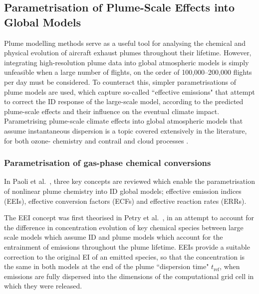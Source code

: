 \subsection{Parametrisation of Plume-Scale Effects into Global Models}
Plume modelling methods serve as a useful tool for analysing the chemical and physical evolution of aircraft exhaust plumes throughout their lifetime. However, integrating high-resolution plume data into global atmospheric models is simply unfeasible when a large number of flights, on the order of 100,000--200,000 flights per day must be considered. To counteract this, simpler parametrisations of plume models are used, which capture so-called ``effective emissions" that attempt to correct the ID response of the large-scale model, according to the predicted plume-scale effects and their influence on the eventual climate impact. Parametrising plume-scale climate effects into global atmospheric models that assume instantaneous dispersion is a topic covered extensively in the literature, for both ozone- chemistry \cite{Meijer1997, Paoli2020, Paoli2011, Cariolle2009} and contrail and cloud processes \cite{Burkhardt2009}. 

\subsubsection{Parametrisation of gas-phase chemical conversions}
In Paoli et al.\ \cite{Paoli2011}, three key concepts are reviewed which enable the parametrisation of nonlinear plume chemistry into ID global models; effective emission indices (EEIs), effective conversion factors (ECFs) and effective reaction rates (ERRs). 

The EEI concept was first theorised in Petry et al.\ \cite{Petry1998}, in an attempt to account for the difference in concentration evolution of key chemical species between large scale models which assume ID and plume models which account for the entrainment of emissions throughout the plume lifetime. EEIs provide a suitable correction to the original EI of an emitted species, so that the concentration is the same in both models at the end of the plume ``dispersion time" ${t_{\mathrm{ref}}}$, when emissions are fully dispersed into the dimensions of the computational grid cell in which they were released.  

